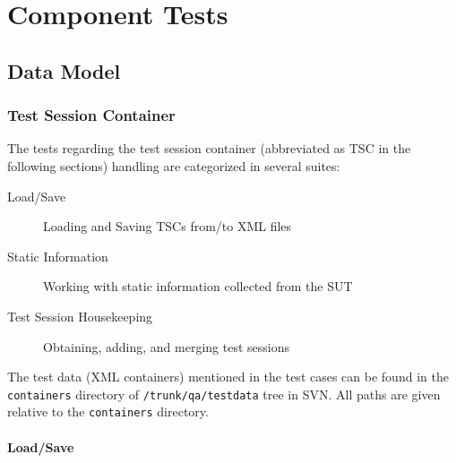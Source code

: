 \documentclass[a4paper,12pt,liststotoc,DIV12]{scrartcl}
\newcommand{\fs}{\texttt}
\begin{document}
\clearpage

\section{Component Tests}
\label{sec:component-tests}
\secttoc


\subsection{Data Model}
\label{sec:data-model}

\subsubsection{Test Session Container}
\label{sec:test-sess-cont}

The tests regarding the test session container (abbreviated as TSC in the
following sections) handling are categorized in several suites:
\begin{description}
\item[Load/Save] Loading and Saving TSCs from/to XML files
\item[Static Information] Working with static information collected from
  the SUT
\item[Test Session Housekeeping] Obtaining, adding, and merging test sessions
\end{description}

The test data (XML containers) mentioned in the test cases can be found in the
\fs{containers} directory of \fs{/trunk/qa/testdata} tree in SVN. All paths
are given relative to the \fs{containers} directory. 

\paragraph{Load/Save}
\label{sec:tsc-load-save}
\end{document}
